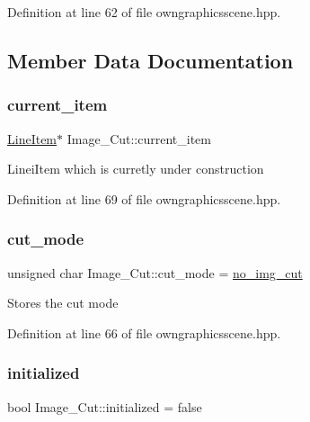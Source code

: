 Definition at line 62 of file owngraphicsscene.\+hpp.



\subsection{Member Data Documentation}
\mbox{\label{structImage__Cut_aa3fcac1ab311c38947b343d8913fb2e8}} 
\subsubsection{\texorpdfstring{current\+\_\+item}{current\_item}}
{\footnotesize\ttfamily \mbox{\hyperlink{classLineItem}{Line\+Item}}$\ast$ Image\+\_\+\+Cut\+::current\+\_\+item}

Linei\+Item which is curretly under construction 

Definition at line 69 of file owngraphicsscene.\+hpp.

\mbox{\label{structImage__Cut_ad4904a8753086961301a91050f6b2794}} 
\subsubsection{\texorpdfstring{cut\+\_\+mode}{cut\_mode}}
{\footnotesize\ttfamily unsigned char Image\+\_\+\+Cut\+::cut\+\_\+mode = \mbox{\hyperlink{owngraphicsscene_8hpp_a749db80b860523fda0b90a1c2afa5067}{no\+\_\+img\+\_\+cut}}}

Stores the cut mode 

Definition at line 66 of file owngraphicsscene.\+hpp.

\mbox{\label{structImage__Cut_a7259136300a6eade3ee84743f3e47c1f}} 
\subsubsection{\texorpdfstring{initialized}{initialized}}
{\footnotesize\ttfamily bool Image\+\_\+\+Cut\+::initialized = false}

